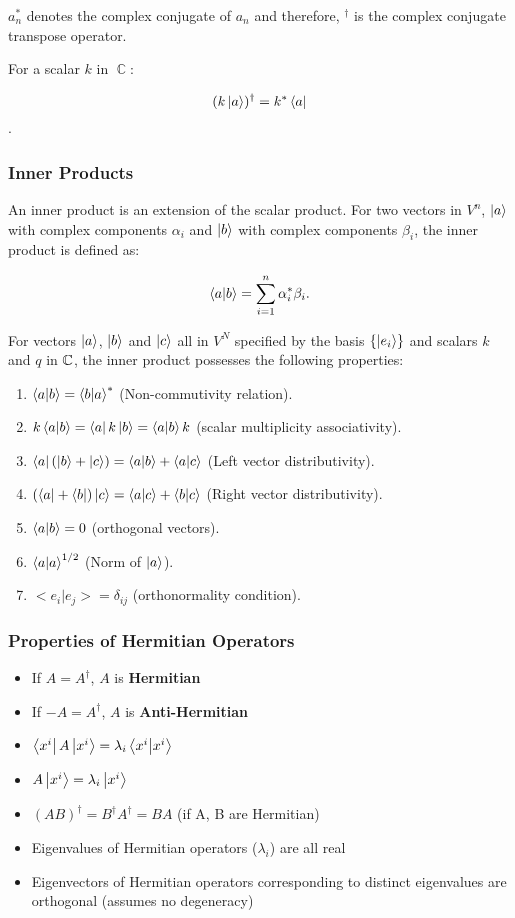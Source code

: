 \documentclass[]{article}
\begin{document}
\noindent $a_n^*$ denotes the complex conjugate of $a_n$ and therefore, $^\dagger$ is the complex conjugate transpose operator.

For a scalar $k$ in $\BbbC$:

\[ (k\ket{a})^\dagger=k^*\bra{a}\].



\subsubsection{Inner Products}

An inner product is an extension of the scalar product. For two vectors in $V^n$, $\ket{a}$ with complex components $\alpha_i$ and $\ket{b}$ with complex components $\beta_i$, the inner product is defined as:

\[ \bra{a}\ket{b}=\sum_{i=1}^n  \alpha_i^* \beta_i .  \]

For vectors $\ket{a}$, $\ket{b}$ and $\ket{c}$ all in $V^N$ specified by the basis $\{\ket{e_i}\}$ and scalars $k$ and $q$ in $\Bbb{C}$, the inner product possesses the following properties:

\begin{enumerate}
    \item $\bra{a}\ket{b}=\bra{b}\ket{a}^*$ (Non-commutivity relation).
    \item $k \bra{a} \ket{b} = \bra{a} k \ket{b} = \bra{a} \ket{b} k$ (scalar multiplicity associativity).
    \item $\bra{a}(\ket{b}+\ket{c})=\bra{a}\ket{b}+\bra{a}\ket{c}$ (Left vector distributivity).
    \item $(\bra{a}+\bra{b})\ket{c} = \bra{a}\ket{c}+\bra{b}\ket{c}$ (Right vector distributivity).
    \item $\bra{a}\ket{b}=0$ (orthogonal vectors).
    \item $\bra{a}\ket{a}^{1/2}$ (Norm of $\ket{a}$).
    \item $<e_i|e_j>=\delta_{ij}$ (orthonormality condition).
\end{enumerate}



\subsubsection{Properties of Hermitian Operators}
\begin{itemize}
    \item If $A = A^{\dagger}$, $A$ is \textbf{Hermitian}
    \item If $-A = A^{\dagger}$, $A$ is \textbf{Anti-Hermitian}
    \item $\bra{x^i}A\ket{x^i} = \lambda_i\bra{x^i}\ket{x^i}$
    \item $A\ket{x^i} = \lambda_i\ket{x^i}$
    \item $(AB)^{\dagger} = B^{\dagger}A^{\dagger} = BA$ (if A, B are Hermitian)
    \item Eigenvalues of Hermitian operators ($\lambda_i$) are all real
    \item Eigenvectors of Hermitian operators corresponding to distinct eigenvalues are orthogonal (assumes no degeneracy)
\end{itemize}
\end{document}
